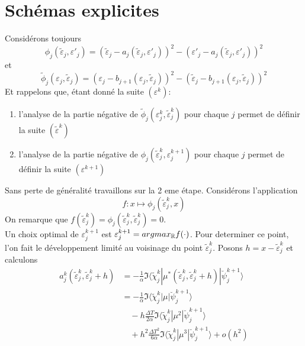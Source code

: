 \section{Schémas explicites}
Considérons toujours
\begin{equation}
\phi_j(\tilde{\varepsilon}_j,\varepsilon'_j) = (\tilde{\varepsilon}_j-a_j(\tilde{\varepsilon}_j,\varepsilon'_j))^2 - (\varepsilon'_j-a_j(\tilde{\varepsilon}_j,\varepsilon'_j))^2
\end{equation}
et
\begin{equation}
\tilde{\phi}_j(\varepsilon_j,\tilde{\varepsilon}_j) = (\varepsilon_j-b_{j+1}(\varepsilon_j,\tilde{\varepsilon}_j))^2 - (\tilde{\varepsilon}_j-b_{j+1}(\varepsilon_j,\tilde{\varepsilon}_j))^2
\end{equation}
Et rappelons que, étant donné la suite $(\varepsilon^{k})$:
\begin{enumerate}
	\item l'analyse de la partie négative de $\tilde{\phi}_j(\varepsilon_j^k,\tilde{\varepsilon}_j^k)$ pour chaque $j$ permet de définir la suite $(\tilde{\varepsilon}^k)$
	\item l'analyse de la partie négative de $\phi_j(\tilde{\varepsilon}_j^k,\varepsilon_j^{k+1})$ pour chaque $j$ permet de définir la suite $(\varepsilon^{k+1})$
\end{enumerate}
Sans perte de généralité travaillons sur la 2 eme étape. Considérons l'application 
$$f : x \mapsto \phi_j(\tilde{\varepsilon}_j^k,x)$$
On remarque que $f(\tilde{\varepsilon}_j^k)=\phi_j(\tilde{\varepsilon}_j^k,\tilde{\varepsilon}_j^k)=0$.\\ Un choix optimal de $\varepsilon_j^{k+1}$ est $\varepsilon_j^{k+1} = argmax_{\mathbb R} f(\cdot)$. Pour determiner ce point, l'on fait le développement limité au voisinage du point $\tilde{\varepsilon}_j^k$. Posons $h=x-\tilde{\varepsilon}_j^k$ et calculons
\begin{align*}
a_j^k(\tilde{\varepsilon}_j^k,\tilde{\varepsilon}_j^k+h)
&=-\frac{1}{\alpha} \Im \langle \tilde{\chi}_j^k |\mu^{*}(\tilde{\varepsilon}_j^k,\tilde{\varepsilon}_j^k+h)| \breve{\psi}_j^{k+1} \rangle\\
&=-\frac{1}{\alpha} \Im \langle \tilde{\chi}_j^k |\mu| \breve{\psi}_j^{k+1} \rangle\\
&\quad -h\frac{\Delta T}{2\alpha} \Im \langle \tilde{\chi}_j^k |\mu^2| \breve{\psi}_j^{k+1} \rangle\\
&\quad +h^2\frac{\Delta T^2}{6\alpha} \Im \langle \tilde{\chi}_j^k |\mu^3| \breve{\psi}_j^{k+1} \rangle + o(h^2)\\
\end{align*}
